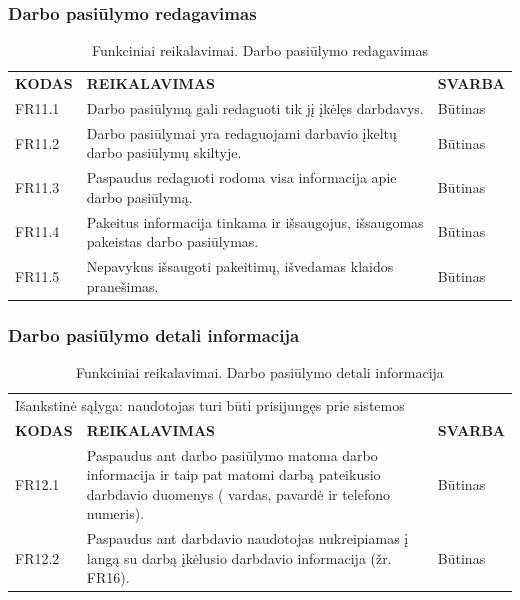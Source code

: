 \documentclass{VUMIFPSkursinis}
\begin{document}
\subsubsection{Darbo pasiūlymo redagavimas}
\begin{table}[H]
\caption{Funkciniai reikalavimai. Darbo pasiūlymo redagavimas}
\centering
\normalsize
\begin{tabular}{|p{2cm}|p{10cm}|p{3cm}|}
\hline
\rowcolor{gray!30}
\multicolumn{3}{|l|}{\textbf{11. Darbo pasiūlymo redagavimas}} \\ \hline
\textbf{KODAS}& \multicolumn{1}{m{10cm}|}{\textbf{REIKALAVIMAS}} & \textbf{SVARBA} \\ \hline
FR11.1 & \multicolumn{1}{m{10cm}|}{Darbo pasiūlymą gali redaguoti tik jį įkėlęs darbdavys.} & Būtinas \\ \hline
FR11.2 & \multicolumn{1}{m{10cm}|}{Darbo pasiūlymai yra redaguojami darbavio įkeltų darbo pasiūlymų skiltyje.} & Būtinas \\ \hline
FR11.3 & \multicolumn{1}{m{10cm}|}{Paspaudus redaguoti rodoma visa informacija apie darbo pasiūlymą.} & Būtinas \\ \hline
FR11.4 & \multicolumn{1}{m{10cm}|}{Pakeitus informacija tinkama ir išsaugojus, išsaugomas pakeistas darbo pasiūlymas.} & Būtinas \\ \hline
FR11.5 & \multicolumn{1}{m{10cm}|}{Nepavykus išsaugoti pakeitimų, išvedamas klaidos pranešimas.} & Būtinas \\ \hline
\end{tabular}
\end{table}

\subsubsection{Darbo pasiūlymo detali informacija}
\begin{table}[H]
\caption{Funkciniai reikalavimai. Darbo pasiūlymo detali informacija}
\centering
\normalsize
\begin{tabular}{|p{2cm}|p{10cm}|p{3cm}|}
\hline
\rowcolor{gray!30}
\multicolumn{3}{|l|}{\textbf{12. Darbo pasiūlymo detali informacija}} \\ \hline
\multicolumn{3}{|l|}{Išankstinė sąlyga: naudotojas turi būti prisijungęs prie sistemos}\\ \hline
\textbf{KODAS}& \multicolumn{1}{m{10cm}|}{\textbf{REIKALAVIMAS}} & \textbf{SVARBA} \\ \hline
FR12.1 & \multicolumn{1}{m{10cm}|}{Paspaudus ant darbo pasiūlymo matoma darbo informacija ir taip pat matomi darbą pateikusio darbdavio duomenys ( vardas, pavardė ir telefono numeris).} & Būtinas \\ \hline
FR12.2 & \multicolumn{1}{m{10cm}|}{Paspaudus ant darbdavio naudotojas nukreipiamas į langą su darbą įkėlusio darbdavio informacija (žr. FR16).} & Būtinas \\ \hline
\end{tabular}
\end{table}
\end{document}
